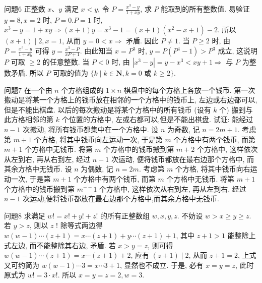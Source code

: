问题6 正整数 $x 、 y$ 满足 $x<y$, 令 $P=\frac{x^3-y}{1+x y}$, 求 $P$ 能取到的所有整数值.
易验证 $y=8, x=2$ 时, $P=0 . P=1$ 时, $x^3-y=1+x y \Rightarrow(x+  1)  y=x^3-1=(x+1)\left(x^2-x+1\right)-2$. 所以 $(x+1) \mid 2, x=1$, 从而 $y= 0<x \Rightarrow$ 矛盾.
因此 $P \neq 1$. 当 $P \geqslant 2$ 时, 由 $P=\frac{x^3-y}{1+x y}$ 可得 $y=\frac{x^3-P}{x P+1}$. 由此知当 $x=P^3$ 时, $y=P\left(P^4-1\right)>P^3$ 成立, 这说明 $P$ 可取 $\geqslant 2$ 的任意整数.
当 $P<0$ 时, 由 $\left|x^3-y\right|=y-x^3<x y+1 \Rightarrow$ 与 $P$ 为整数矛盾.
所以 $P$ 可取的值为 $\{k \mid k \in \mathbf{N}, k=0$ 或 $k \geqslant 2\}$.



问题7 在一个由 $n$ 个方格组成的 $1 \times n$ 棋盘中的每个方格上各放一个钱币.
第一次搬动是将某一个方格上的钱币放在相邻的一个方格中的钱币上, 左边或右边都可以,但是不能出棋盘.
以后的每次搬动是将某个方格中的所有钱币 (设有 $k$ 个) 搬到与此方格相邻的第 $k$ 个位置的方格中, 左或右都可以,但是不能出棋盘.
试证: 能经过 $n-1$ 次搬动, 将所有钱币都集中在一个方格中.
设 $n$ 为奇数, 记 $n=2 m+1$. 考虑第 $m+1$ 个方格, 将其中钱币向左运动一次, 于是第 $m$ 个方格中有两个钱币, 而第 $m+1$ 个方格中无钱币.
将第 $m$ 个方格中的钱币搬到第 $m+2$ 个方格中, 这样依次从左到右, 再从右到左, 经过 $n-1$ 次运动, 便将钱币都放在最右边那个方格中, 而其余方格中无钱币.
设 $n$ 为偶数, 记 $n=2 m$. 考虑第 $m$ 个方格, 将其中钱币向右运动一次, 于是第 $m+1$ 个方格中有两个钱币, 而第 $m$ 个方格中无钱币.
将第 $m+1$ 个方格中的钱币搬到第 $m^{--} 1$ 个方格中, 这样依次从右到左, 再从左到右, 经过 $n-1$ 次运动,便将钱币都放在最右边那个方格中,而其余方格中无钱币.



问题8 求满足 $w !=x !+y !+z !$ 的所有正整数组 $w, x, y, z$.
不妨设 $w>x \geqslant y \geqslant z$. 若 $y>z$, 则以 $z$ ! 除等式两边得 $w(w-1) \cdots (z+1)=x \cdots(z+1)+y \cdots(z+1)+1$, 其中 $z+1>1$ 能整除上式左边, 而不能整除其右边, 矛盾.
若 $x>y=z$, 则可得 $w(w-1) \cdots(z+1)=x \cdots(z+ 1)+2$, 应有 $(z+1) \mid 2$, 从而 $z+1=2$, 上式又可约简为 $w(w-1) \cdots 3=x \cdots 3+1$, 显然也不成立.
于是, 必有 $x=y=z$, 此时原式为 $w !=3 \cdot x !$. 所以 $x=y=z=2, w=3$.



